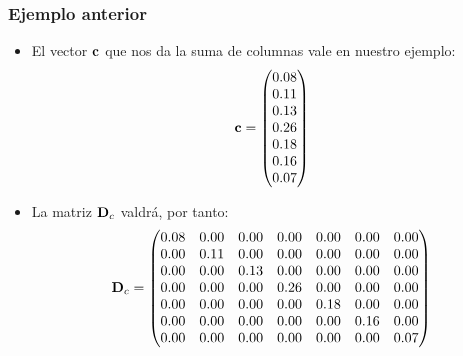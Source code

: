 \begin{frame}
\frametitle{Ejemplo anterior}
\begin{itemize}
\item<2->{El vector $\mathbf{c}$ que nos da la suma de columnas vale en nuestro ejemplo:
{\tiny $$
\mathbf{c}=\begin{pmatrix}
0.08 \\
0.11 \\
0.13 \\
0.26 \\
0.18 \\
0.16 \\
0.07 
\end{pmatrix}
$$}}
\item<3->{La matriz $\mathbf{D}_c$ valdrá, por tanto:
{\tiny
$$
\mathbf{D}_c = \begin{pmatrix}
0.08 & 0.00 & 0.00 & 0.00 & 0.00 & 0.00 & 0.00 \\
0.00 & 0.11 & 0.00 & 0.00 & 0.00 & 0.00 & 0.00 \\
0.00 & 0.00 & 0.13 & 0.00 & 0.00 & 0.00 & 0.00 \\
0.00 & 0.00 & 0.00 & 0.26 & 0.00 & 0.00 & 0.00 \\
0.00 & 0.00 & 0.00 & 0.00 & 0.18 & 0.00 & 0.00 \\
0.00 & 0.00 & 0.00 & 0.00 & 0.00 & 0.16 & 0.00 \\
0.00 & 0.00 & 0.00 & 0.00 & 0.00 & 0.00 & 0.07 
\end{pmatrix}
$$}}
\end{itemize}
\end{frame}
